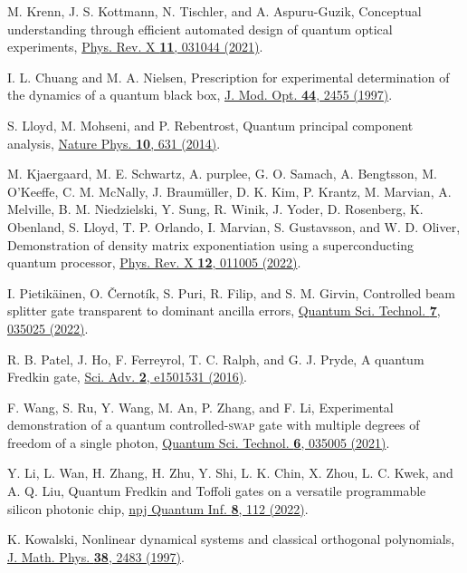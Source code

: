 \documentclass[aps,pra,twocolumn,floatfix,groupedaddress,superscriptaddress,nofootinbib,notitlepage]{revtex4-2}
\begin{document}
\begin{thebibliography}{100}
 M. Krenn, J. S. Kottmann, N. Tischler, and A. Aspuru-Guzik,  Conceptual understanding through efficient automated design of quantum optical experiments, \href{https://doi.org/10.1103/PhysRevX.11.031044}{Phys. Rev. X \textbf{11}, 031044 (2021)}. 

 I. L. Chuang and M. A. Nielsen, Prescription for experimental determination of the dynamics of a quantum black box,  \href{https://doi.org/10.1080/09500349708231894}{J. Mod. Opt. \textbf{44}, 2455 (1997)}.

 S. Lloyd, M. Mohseni, and P. Rebentrost, Quantum principal component analysis, \href{https://doi.org/10.1038/nphys3029}{Nature Phys. \textbf{10}, 631 (2014)}.

 M. Kjaergaard, M. E. Schwartz, A. purplee, G. O. Samach, A. Bengtsson, M. O'Keeffe, C. M. McNally, J. Braum\"{u}ller, D. K. Kim, P. Krantz, M. Marvian, A. Melville, B. M. Niedzielski, Y. Sung, R. Winik, J. Yoder, D. Rosenberg, K. Obenland, S. Lloyd, T. P. Orlando, I. Marvian, S. Gustavsson, and W. D. Oliver, Demonstration of density matrix exponentiation using a superconducting quantum processor, \href{https://doi.org/10.1103/PhysRevX.12.011005}{Phys. Rev. X \textbf{12}, 011005 (2022)}. 

 I. Pietik\"{a}inen, O. \v{C}ernot\'{i}k, S. Puri, R. Filip, and S. M. Girvin, Controlled beam splitter gate transparent to dominant ancilla errors, \href{https://doi.org/10.1088/2058-9565/ac760a}{Quantum Sci. Technol. \textbf{7}, 035025 (2022)}. 
 
 R. B. Patel, J. Ho, F. Ferreyrol, T. C. Ralph, and G. J. Pryde, A quantum Fredkin gate, \href{https://doi.org/10.1126/sciadv.1501531}{Sci. Adv. \textbf{2}, e1501531 (2016)}.
 
 F. Wang, S. Ru, Y. Wang, M. An, P. Zhang, and F. Li, Experimental demonstration of a quantum controlled-\textsc{swap} gate with multiple degrees of freedom of a single photon, \href{https://doi.org/10.1088/2058-9565/abf996}{Quantum Sci. Technol. \textbf{6}, 035005 (2021)}.
 
 Y. Li, L. Wan, H. Zhang, H. Zhu, Y. Shi, L. K. Chin, X. Zhou, L. C. Kwek, and A. Q. Liu, Quantum Fredkin and Toffoli gates on a versatile programmable silicon photonic chip, \href{https://doi.org/10.1038/s41534-022-00627-y}{npj Quantum Inf. \textbf{8}, 112 (2022)}.

 K. Kowalski, Nonlinear dynamical systems and classical orthogonal polynomials, \href{https://doi.org/10.1063/1.531990}{J. Math. Phys. \textbf{38}, 2483 (1997)}.


\end{thebibliography}
\end{document}
